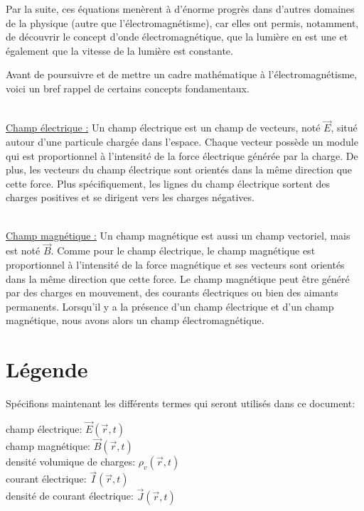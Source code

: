 \documentclass[12pt]{article}
\begin{document}
\noindent Par la suite, ces équations menèrent à d’énorme progrès dans d’autres domaines de la physique (autre que l’électromagnétisme), car elles ont permis, notamment, de découvrir le concept d’onde électromagnétique, que la lumière en est une et également que la vitesse de la lumière est constante.


\noindent Avant de poursuivre et de mettre un cadre mathématique à l’électromagnétisme, voici un bref rappel de certains concepts fondamentaux.

\noindent \\\underline{Champ électrique :} Un champ électrique est un champ de vecteurs, noté $\vec{E}$, situé autour d'une particule chargée dans l'espace. Chaque vecteur possède un module qui est proportionnel à l'intensité de la force électrique générée par la charge. De plus, les vecteurs du champ électrique sont orientés dans la même direction que cette force. Plus spécifiquement, les lignes du champ électrique sortent des charges positives et se dirigent vers les charges négatives. 

\noindent \\\underline{Champ magnétique :} Un champ magnétique est aussi un champ vectoriel, mais est noté $\vec{B}$. Comme pour le champ électrique, le champ magnétique est proportionnel à l'intensité de la force magnétique et ses vecteurs sont orientés dans la même direction que cette force. Le champ magnétique peut être généré par des charges en mouvement, des courants électriques ou bien des aimants permanents. Lorsqu'il y a la présence d'un champ électrique et d'un champ magnétique, nous avons alors un champ électromagnétique. 

\newpage\section*{Légende}
\justifying
\noindent Spécifions maintenant les différents termes qui seront utilisés dans ce document:


\begin{center}
    champ électrique: $\vec{E}(\vec{r},t)$
    \\champ magnétique: $\vec{B}(\vec{r},t)$
    \\densité volumique de charges: $\rho_v(\vec{r},t)$
    \\courant électrique: $\vec{I}(\vec{r},t)$
    \\ densité de courant électrique: $\vec{J}(\vec{r},t)$ 
\end{center}
\end{document}
